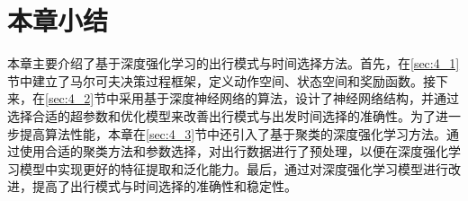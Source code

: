 \section{本章小结}

本章主要介绍了基于深度强化学习的出行模式与时间选择方法。首先，在\ref{sec:4_1}节中建立了马尔可夫决策过程框架，定义动作空间、状态空间和奖励函数。接下来，在\ref{sec:4_2}节中采用基于深度神经网络的算法，设计了神经网络结构，并通过选择合适的超参数和优化模型来改善出行模式与出发时间选择的准确性。为了进一步提高算法性能，本章在\ref{sec:4_3}节中还引入了基于聚类的深度强化学习方法。通过使用合适的聚类方法和参数选择，对出行数据进行了预处理，以便在深度强化学习模型中实现更好的特征提取和泛化能力。最后，通过对深度强化学习模型进行改进，提高了出行模式与时间选择的准确性和稳定性。
